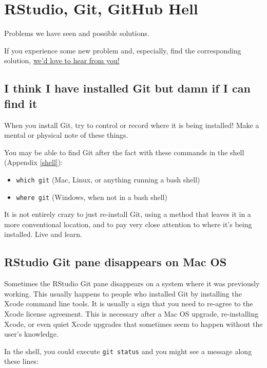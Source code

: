\documentclass[
]{book}
\begin{document}
\chapter{RStudio, Git, GitHub Hell}\label{troubleshooting}

Problems we have seen and possible solutions.

If you experience some new problem and, especially, find the corresponding solution, \href{https://github.com/jennybc/happy-git-with-r/issues}{we'd love to hear from you!}

\section{I think I have installed Git but damn if I can find it}\label{i-think-i-have-installed-git-but-damn-if-i-can-find-it}

When you install Git, try to control or record where it is being installed!
Make a mental or physical note of these things.

You may be able to find Git after the fact with these commands in the shell (Appendix \ref{shell}):

\begin{itemize}
\item
  \texttt{which\ git} (Mac, Linux, or anything running a bash shell)
\item
  \texttt{where\ git} (Windows, when not in a bash shell)
\end{itemize}

It is not entirely crazy to just re-install Git, using a method that leaves it in a more conventional location, and to pay very close attention to where it's being installed.
Live and learn.

\section{RStudio Git pane disappears on Mac OS}\label{rstudio-git-pane-disappears-on-mac-os}

Sometimes the RStudio Git pane disappears on a system where it was previously working.
This usually happens to people who installed Git by installing the Xcode command line tools.
It is usually a sign that you need to re-agree to the Xcode license agreement. This is necessary after a Mac OS upgrade, re-installing Xcode, or even quiet Xcode upgrades that sometimes seem to happen without the user's knowledge.

In the shell, you could execute \texttt{git\ status} and you might see a message along these lines:
\end{document}
